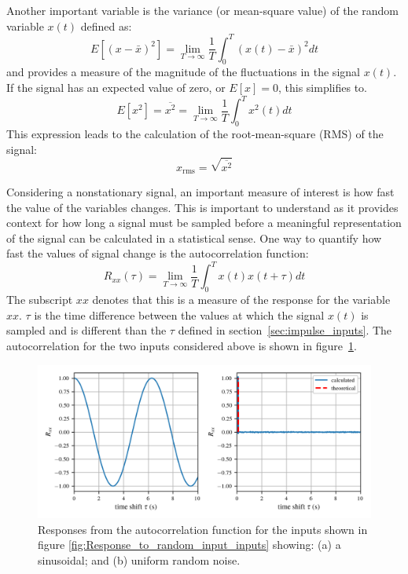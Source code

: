 \documentclass[12pt,letter]{article}
\begin{document}
Another important variable is the variance (or mean-square value) of the random variable $x(t)$ defined as:
\begin{equation}
E[(x-\bar{x})^2] = \lim\limits_{T \rightarrow \infty} \frac{1}{T} \int_{0}^{T}(x(t)-\bar{x})^2dt
\end{equation}
and provides a measure of the magnitude of the fluctuations in the signal $x(t)$. If the signal has an expected value of zero, or $E[x]=0$, this simplifies to. 
\begin{equation}
E[x^2] = \overline{x^2} = \lim\limits_{T \rightarrow \infty} \frac{1}{T} \int_{0}^{T}x^2(t)dt
\end{equation}
This expression leads to the calculation of the root-mean-square (RMS) of the signal:
\begin{equation}
x_\text{rms} = \sqrt{\overline{x^2}} 
\end{equation}

Considering a nonstationary signal, an important measure of interest is how fast the value of the variables changes. This is important to understand as it provides context for how long a signal must be sampled before a meaningful representation of the signal can be calculated in a statistical sense. One way to quantify how fast the values of signal change is the autocorrelation function: 
\begin{equation}
R_{xx}(\tau) = \lim\limits_{T \rightarrow \infty} \frac{1}{T} \int_{0}^{T}x(t)x(t+\tau)dt
\end{equation}
The subscript $xx$ denotes that this is a measure of the response for the variable $xx$. $\tau$ is the time difference between the values at which the signal $x(t)$ is sampled and is different than the $\tau$ defined in section~\ref{sec:impulse_inputs}. The autocorrelation for the two inputs considered above is shown in figure~\ref{fig:Response_to_random_input_autocorrelation}.
\begin{figure}[H]
	\centering
	\includegraphics[width=6.5in]{../figures/Response_to_random_input_autocorrelation}
	\caption{Responses from the autocorrelation function for the inputs shown in figure \ref{fig:Response_to_random_input_inputs} showing: (a) a sinusoidal; and (b) uniform random noise.}
	\label{fig:Response_to_random_input_autocorrelation}
\end{figure} 
\end{document}
